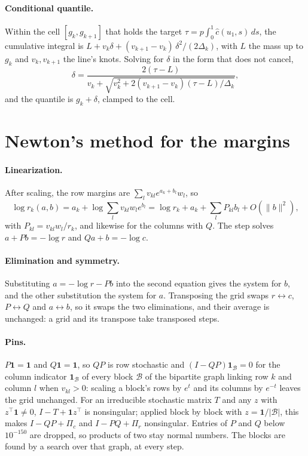 \documentclass[11pt]{article}
\newcommand{\one}{\mathbf{1}}
\begin{document}
\paragraph{Conditional quantile.} Within the cell $[g_k, g_{k+1}]$ that holds
the target $\tau = p \int_0^1 \hat c(u_1, s)\, ds$, the cumulative integral is
$L + v_k \delta + (v_{k+1} - v_k)\,\delta^2 / (2\Delta_k)$, with $L$ the mass
up to $g_k$ and $v_k, v_{k+1}$ the line's knots. Solving for $\delta$ in the
form that does not cancel,
\[
  \delta = \frac{2(\tau - L)}{v_k + \sqrt{v_k^2 + 2 (v_{k+1} - v_k)
           (\tau - L) / \Delta_k}},
\]
and the quantile is $g_k + \delta$, clamped to the cell.

\section{Newton's method for the margins}
\label{app:newton}

\paragraph{Linearization.} After scaling, the row margins are
$\sum_l v_{kl} e^{a_k + b_l} w_l$, so
\[
  \log r_k(a, b) = a_k + \log \sum_l v_{kl} w_l e^{b_l}
  = \log r_k + a_k + \sum_l P_{kl} b_l + O(\lVert b \rVert^2),
\]
with $P_{kl} = v_{kl} w_l / r_k$, and likewise for the columns with $Q$. The
step solves $a + Pb = -\log r$ and $Qa + b = -\log c$.

\paragraph{Elimination and symmetry.} Substituting $a = -\log r - Pb$ into the
second equation gives the system for $b$, and the other substitution the
system for $a$. Transposing the grid swaps $r \leftrightarrow c$,
$P \leftrightarrow Q$ and $a \leftrightarrow b$, so it swaps the two
eliminations, and their average is unchanged: a grid and its transpose take
transposed steps.

\paragraph{Pins.} $P \one = \one$ and $Q \one = \one$, so $QP$ is row
stochastic and $(I - QP)\one_{\mathcal B} = 0$ for the column indicator
$\one_{\mathcal B}$ of every block $\mathcal B$ of the bipartite graph linking
row $k$ and column $l$ when $v_{kl} > 0$: scaling a block's rows by $e^t$ and
its columns by $e^{-t}$ leaves the grid unchanged. For an irreducible
stochastic matrix $T$ and any $z$ with $z^\top \one \neq 0$, $I - T +
\one z^\top$ is nonsingular; applied block by block with $z = \one /
|\mathcal B|$, this makes $I - QP + \Pi_c$ and $I - PQ + \Pi_r$ nonsingular.
Entries of $P$ and $Q$ below $10^{-150}$ are dropped, so products of two stay
normal numbers. The blocks are found by a search over that graph, at every
step.
\end{document}
